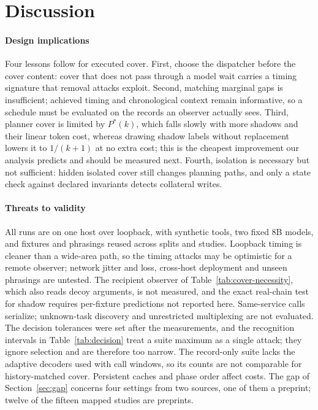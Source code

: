 \section{Discussion}\label{sec:discussion}
\paragraph{Design implications}
Four lessons follow for executed cover. First, choose the dispatcher before the cover content: cover that does not pass through a model wait carries a timing signature that removal attacks exploit. Second, matching marginal gaps is insufficient; achieved timing and chronological context remain informative, so a schedule must be evaluated on the records an observer actually sees. Third, planner cover is limited by $P^*(k)$, which falls slowly with more shadows and their linear token cost, whereas drawing shadow labels without replacement lowers it to $1/(k+1)$ at no extra cost; this is the cheapest improvement our analysis predicts and should be measured next. Fourth, isolation is necessary but not sufficient: hidden isolated cover still changes planning paths, and only a state check against declared invariants detects collateral writes.

\paragraph{Threats to validity}\label{sec:limits}
All runs are on one host over loopback, with synthetic tools, two fixed 8B models, and fixtures and phrasings reused across splits and studies. Loopback timing is cleaner than a wide-area path, so the timing attacks may be optimistic for a remote observer; network jitter and loss, cross-host deployment and unseen phrasings are untested. The recipient observer of Table~\ref{tab:cover-necessity}, which also reads decoy arguments, is not measured, and the exact real-chain test for shadow requires per-fixture predictions not reported here. Same-service calls serialize; unknown-task discovery and unrestricted multiplexing are not evaluated. The decision tolerances were set after the measurements, and the recognition intervals in Table~\ref{tab:decision} treat a suite maximum as a single attack; they ignore selection and are therefore too narrow. The record-only suite lacks the adaptive decoders used with call windows, so its counts are not comparable for history-matched cover. Persistent caches and phase order affect costs. The gap of Section~\ref{sec:gap} concerns four settings from two sources, one of them a preprint; twelve of the fifteen mapped studies are preprints.

